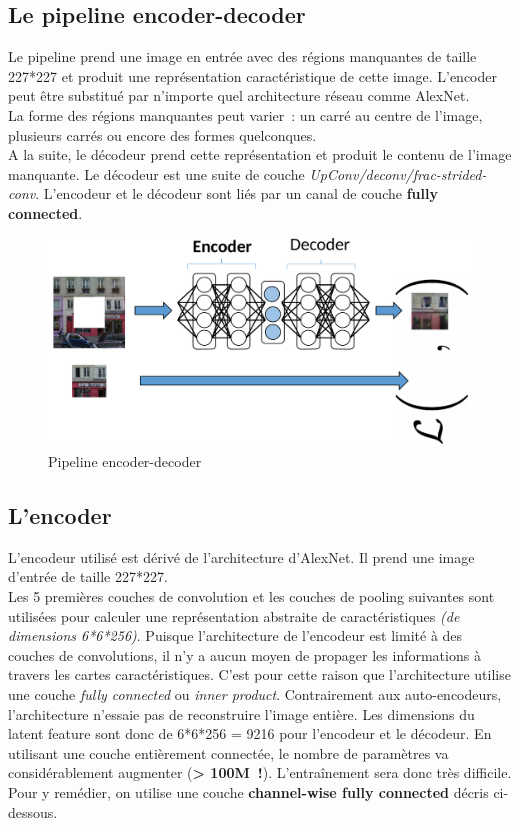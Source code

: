 \documentclass[11pt,a4paper]{article}
\begin{document}
    \subsection{Le pipeline encoder-decoder}
        Le pipeline prend une image en entrée avec des régions manquantes de taille 227*227 et produit une représentation caractéristique de cette image. L’encoder peut être substitué par n’importe quel architecture réseau comme AlexNet.\\
    La forme des régions manquantes peut varier : un carré au centre de l’image, plusieurs carrés ou encore des formes quelconques.\\
    A la suite, le décodeur prend cette représentation et produit le contenu de l’image manquante. Le décodeur est une suite de couche \emph{UpConv/deconv/frac-strided-conv}. L’encodeur et le décodeur sont liés par un canal de couche \textbf{fully connected}.
        \begin{figure}[H]
            \centering
            \includegraphics[scale=0.2]{pipeline.png} 
            \caption{Pipeline encoder-decoder}
        \end{figure}

        \subsection{L'encoder}
            L’encodeur utilisé est dérivé de l’architecture d’AlexNet. Il prend une image d’entrée de taille 227*227.\\
            Les 5 premières couches de convolution et les couches de pooling suivantes sont utilisées pour calculer une représentation abstraite de caractéristiques \emph{(de dimensions 6*6*256)}. Puisque l’architecture de l’encodeur est limité à des couches de convolutions, il n’y a aucun moyen de propager les informations à travers les cartes caractéristiques. C’est pour cette raison que l’architecture utilise une couche \emph{fully connected} ou \emph{inner product}. Contrairement aux auto-encodeurs, l’architecture n’essaie pas de reconstruire l’image entière. Les dimensions du latent feature sont donc de 6*6*256 = 9216 pour l’encodeur et le décodeur. En utilisant une couche entièrement connectée, le nombre de paramètres va considérablement augmenter (\textbf{> 100M !}). L’entraînement sera donc très difficile.  Pour y remédier, on utilise une couche \textbf{channel-wise fully connected} décris ci-dessous. 
        
\end{document}
